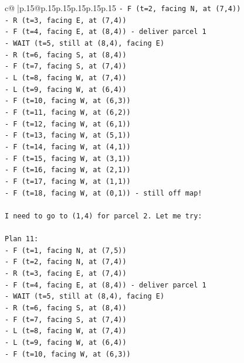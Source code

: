 \documentclass{article}
\begin{document}
{\begin{supertabular}{c@{$\;$}|p{.15\linewidth}@{}p{.15\linewidth}p{.15\linewidth}p{.15\linewidth}p{.15\linewidth}p{.15\linewidth}}
{{{\texttt{{-} F (t=2, facing N, at (7,4))} \\
\texttt{{-} R (t=3, facing E, at (7,4))} \\
\texttt{{-} F (t=4, facing E, at (8,4)) {-} deliver parcel 1} \\
\texttt{{-} WAIT (t=5, still at (8,4), facing E)} \\
\texttt{{-} R (t=6, facing S, at (8,4))} \\
\texttt{{-} F (t=7, facing S, at (7,4))} \\
\texttt{{-} L (t=8, facing W, at (7,4))} \\
\texttt{{-} L (t=9, facing W, at (6,4))} \\
\texttt{{-} F (t=10, facing W, at (6,3))} \\
\texttt{{-} F (t=11, facing W, at (6,2))} \\
\texttt{{-} F (t=12, facing W, at (6,1))} \\
\texttt{{-} F (t=13, facing W, at (5,1))} \\
\texttt{{-} F (t=14, facing W, at (4,1))} \\
\texttt{{-} F (t=15, facing W, at (3,1))} \\
\texttt{{-} F (t=16, facing W, at (2,1))} \\
\texttt{{-} F (t=17, facing W, at (1,1))} \\
\texttt{{-} F (t=18, facing W, at (0,1)) {-} still off map!} \\
\\ 
\texttt{I need to go to (1,4) for parcel 2. Let me try:} \\
\\ 
\texttt{Plan 11:} \\
\texttt{{-} F (t=1, facing N, at (7,5))} \\
\texttt{{-} F (t=2, facing N, at (7,4))} \\
\texttt{{-} R (t=3, facing E, at (7,4))} \\
\texttt{{-} F (t=4, facing E, at (8,4)) {-} deliver parcel 1} \\
\texttt{{-} WAIT (t=5, still at (8,4), facing E)} \\
\texttt{{-} R (t=6, facing S, at (8,4))} \\
\texttt{{-} F (t=7, facing S, at (7,4))} \\
\texttt{{-} L (t=8, facing W, at (7,4))} \\
\texttt{{-} L (t=9, facing W, at (6,4))} \\
\texttt{{-} F (t=10, facing W, at (6,3))} \\
}}}
\end{supertabular}}
\end{document}
